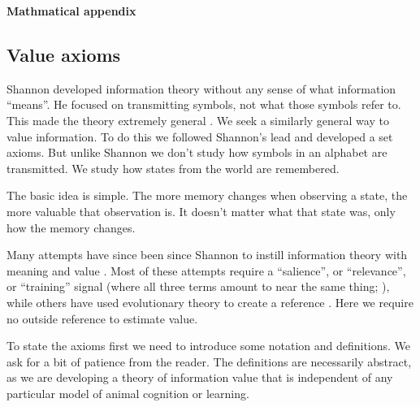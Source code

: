\documentclass[9pt,twocolumn,twoside]{pnas-new}
\begin{document}
\pagebreak
\onecolumngrid
\begin{center}
    \textbf{\large Mathmatical appendix}
\end{center}
\setcounter{equation}{0}
\setcounter{figure}{0}
\setcounter{table}{0}
\setcounter{definition}{0}
\setcounter{axiom}{0}
\setcounter{theorem}{0}
\setcounter{corollary}{0}
\setcounter{lemma}{0}
\setcounter{page}{0}

\makeatletter
\renewcommand{\suppaxiom}{S\arabic{axiom}}
\renewcommand{\suppequation}{S\arabic{equation}}
\renewcommand{\suppfigure}{S\arabic{figure}}
\renewcommand{\bibnumfmt}[1]{[S#1]}
\renewcommand{\citenumfont}[1]{S#1}


\subsection*{Value axioms}
Shannon developed information theory without any sense of what information ``means''. He focused on transmitting symbols, not what those symbols refer to. This made the theory extremely general \citep{Shannon1948}. We seek a similarly general way to value information. To do this we followed Shannon's lead and developed a set axioms. But unlike Shannon we don't study how symbols in an alphabet are transmitted. We study how states from the world are remembered.

The basic idea is simple. The more memory changes when observing a state, the more valuable that observation is. It doesn't matter what that state was, only how the memory changes.

Many attempts have since been since Shannon to instill information theory with meaning and value \citep{Kolchinsky2018}. Most of these attempts require a ``salience'', or ``relevance'', or ``training'' signal (where all three terms amount to near the same thing; \cite{Deacon2015,Tishby}), while others have used evolutionary theory to create a reference \citep{Kolchinsky2018,Deacon2015}. Here we require no outside reference to estimate value. 

To state the axioms first we need to introduce some notation and definitions. We ask for a bit of patience from the reader. The definitions are necessarily abstract, as we are developing a theory of information value that is independent of any particular model of animal cognition or learning.
\end{document}
